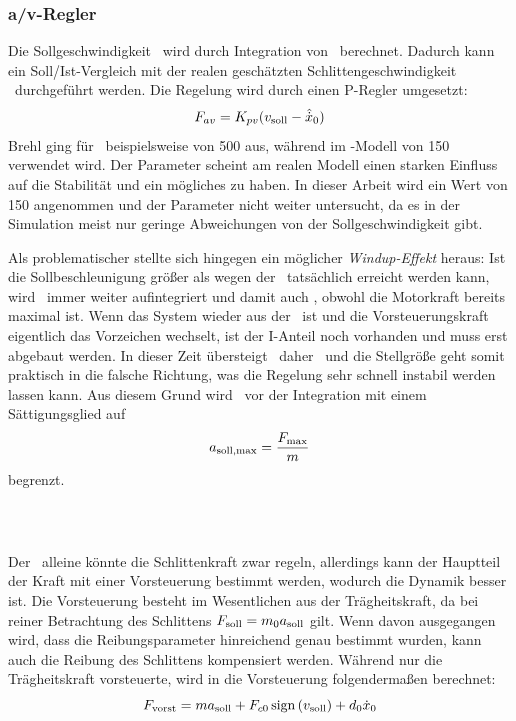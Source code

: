 \subsubsection{a/v-Regler}
Die Sollgeschwindigkeit \vsoll\ wird durch Integration von \asoll\ berechnet.
Dadurch kann ein Soll/Ist-Vergleich mit der realen \bzw geschätzten Schlittengeschwindigkeit \xop\ durchgeführt werden.
Die Regelung wird durch einen P-Regler umgesetzt:
	\[
	F_{av}= K_{pv} (v_{\mathrm{soll}}-\hat{\dot{x}}_0)
\]
Brehl \cite{brehl} ging für \kpv\ beispielsweise von 500 aus, während im \sm-Modell von \cite{chang} 150 verwendet wird.
Der Parameter scheint am realen Modell einen starken Einfluss auf die Stabilität und ein mögliches  zu haben.
In dieser Arbeit wird ein Wert von 150 angenommen und der Parameter nicht weiter untersucht, da es in der Simulation meist nur geringe Abweichungen von der Sollgeschwindigkeit gibt.

Als problematischer stellte sich hingegen ein möglicher \emph{Windup-Effekt} heraus: 
Ist die Sollbeschleunigung größer als wegen der \sgb\ tatsächlich erreicht werden kann, wird \vsoll\ immer weiter aufintegriert und damit auch \fav, obwohl die Motorkraft bereits maximal ist. 
Wenn das System wieder aus der \sgb\ ist und die Vorsteuerungskraft eigentlich das Vorzeichen wechselt, ist der I-Anteil noch vorhanden und muss erst abgebaut werden.
In dieser Zeit übersteigt \fav\ daher \fvorst\ und die Stellgröße geht somit praktisch in die falsche Richtung, was die Regelung sehr schnell instabil werden lassen kann.
Aus diesem Grund wird \asoll\ vor der Integration mit einem Sättigungsglied auf 
	\[
	a_{\mathrm{soll,max}}=\frac{F_{\mathrm{max}}}{m}
\] 
begrenzt.

\subsubsection{\vorst\  }\label{sec:vorstmcd}
Der \avr\ alleine könnte die Schlittenkraft zwar regeln, allerdings kann der Hauptteil der Kraft mit einer Vorsteuerung bestimmt werden, wodurch die Dynamik besser ist.
Die Vorsteuerung besteht im Wesentlichen aus der Trägheitskraft, da bei reiner Betrachtung des Schlittens $F_{\mathrm{soll}}=m_0 a_{\mathrm{soll}}$ gilt. 
Wenn davon ausgegangen wird, dass die Reibungsparameter hinreichend genau bestimmt wurden, kann auch die Reibung des Schlittens kompensiert werden.
Während \cite{brehl} nur die Trägheitskraft vorsteuerte, wird in \cite{chang} die Vorsteuerung folgendermaßen berechnet:
	\[
	F_{\mathrm{vorst}}=m a_{\mathrm{soll}} + F_{c0} \, \mathrm{sign}\left(v_{\mathrm{soll}}\right) + d_0 \dot{x}_0
\]

